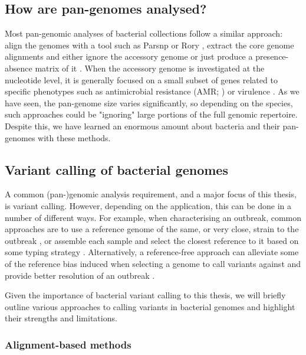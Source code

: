 \subsection{How are pan-genomes analysed?}
\label{sec:analyse-pangenome}

Most pan-genomic analyses of bacterial collections follow a similar approach: align the genomes with a tool such as Parsnp \cite{Treangen2014} or Rory \cite{Page2015}, extract the core genome alignments and either ignore the accessory genome or just produce a presence-absence matrix of it \cite{Arnold2018,Azarian2018,McNally2016,thepangenome2020}. When the accessory genome is investigated at the nucleotide level, it is generally focused on a small subset of genes related to specific phenotypes such as antimicrobial resistance (AMR; \cite{Boolchandani2019}) or virulence \cite{Vasquez2019}. As we have seen, the pan-genome size varies significantly, so depending on the species, such approaches could be "ignoring" large portions of the full genomic repertoire. Despite this, we have learned an enormous amount about bacteria and their pan-genomes with these methods.

\subsection{Variant calling of bacterial genomes}
\label{sec:intro-bacteria-var-call}

A common (pan-)genomic analysis requirement, and a major focus of this thesis, is variant calling. However, depending on the application, this can be done in a number of different ways. For example, when characterising an outbreak, common approaches are to use a reference genome of the same, or very close, strain to the outbreak \cite{Taylor2015}, or assemble each sample and select the closest reference to it based on some typing strategy \cite{Wyres2021}. Alternatively, a reference-free approach can alleviate some of the reference bias induced when selecting a genome to call variants against and provide better resolution of an outbreak \cite{Cremers2020}.

Given the importance of bacterial variant calling to this thesis, we will briefly outline various approaches to calling variants in bacterial genomes and highlight their strengths and limitations.

\subsubsection{Alignment-based methods}

